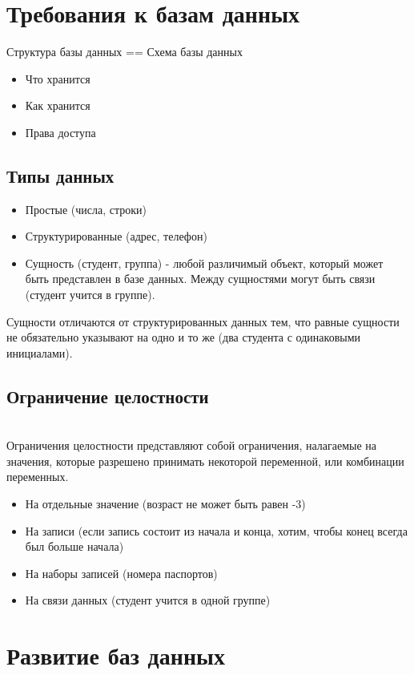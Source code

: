 \documentclass{amsart}
\begin{document}

\section{Требования к базам данных}

Структура базы данных == Схема базы данных
\begin{itemize}
  \item Что хранится
  \item Как хранится
  \item Права доступа
\end{itemize}

\subsection{Типы данных}
\begin{itemize}
  \item Простые (числа, строки)
  \item Структурированные (адрес, телефон)
  \item Сущность (студент, группа) - любой различимый объект, который может быть представлен в базе данных. Между сущностями могут быть связи (студент учится в группе).
\end{itemize}
 Сущности отличаются от структурированных данных тем, что равные сущности не обязательно указывают на одно и то же (два студента с одинаковыми инициалами).

\subsection{Ограничение целостности}
\hfill \\
Ограничения целостности представляют собой ограничения, налагаемые на
значения, которые разрешено принимать некоторой переменной, или комбинации переменных.
\begin{itemize}
  \item На отдельные значение (возраст не может быть равен -3)
  \item На записи (если запись состоит из начала и конца, хотим, чтобы конец всегда был больше начала)
  \item На наборы записей (номера паспортов)
  \item На связи данных (студент учится в одной группе)
\end{itemize}

\section{Развитие баз данных}
\end{document}
